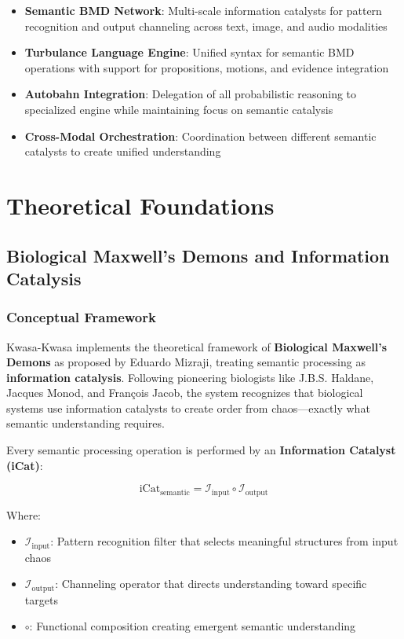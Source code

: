 \documentclass[12pt,a4paper,twoside]{article}
\begin{document}
\begin{itemize}
\item \textbf{Semantic BMD Network}: Multi-scale information catalysts for pattern recognition and output channeling across text, image, and audio modalities
\item \textbf{Turbulance Language Engine}: Unified syntax for semantic BMD operations with support for propositions, motions, and evidence integration
\item \textbf{Autobahn Integration}: Delegation of all probabilistic reasoning to specialized engine while maintaining focus on semantic catalysis
\item \textbf{Cross-Modal Orchestration}: Coordination between different semantic catalysts to create unified understanding
\end{itemize}

\section{Theoretical Foundations}

\subsection{Biological Maxwell's Demons and Information Catalysis}

\subsubsection{Conceptual Framework}

Kwasa-Kwasa implements the theoretical framework of \textbf{Biological Maxwell's Demons} as proposed by Eduardo Mizraji, treating semantic processing as \textbf{information catalysis}. Following pioneering biologists like J.B.S. Haldane, Jacques Monod, and François Jacob, the system recognizes that biological systems use information catalysts to create order from chaos—exactly what semantic understanding requires.

Every semantic processing operation is performed by an \textbf{Information Catalyst (iCat)}:

\begin{equation}
\text{iCat}_{\text{semantic}} = \mathcal{I}_{\text{input}} \circ \mathcal{I}_{\text{output}}
\end{equation}

Where:
\begin{itemize}
\item $\mathcal{I}_{\text{input}}$: Pattern recognition filter that selects meaningful structures from input chaos
\item $\mathcal{I}_{\text{output}}$: Channeling operator that directs understanding toward specific targets
\item $\circ$: Functional composition creating emergent semantic understanding
\end{itemize}
\end{document}
